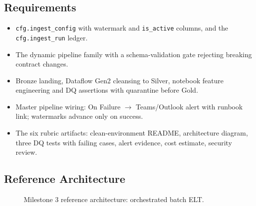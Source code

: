 \subsection*{Requirements}
\begin{itemize}
    \item \texttt{cfg.ingest\_config} with watermark and \texttt{is\_active} columns, and the \texttt{cfg.ingest\_run} ledger.
    \item The dynamic pipeline family with a schema-validation gate rejecting breaking contract changes.
    \item Bronze landing, Dataflow Gen2 cleansing to Silver, notebook feature engineering and DQ assertions with quarantine before Gold.
    \item Master pipeline wiring: On Failure $\rightarrow$ Teams/Outlook alert with runbook link; watermarks advance only on success.
    \item The six rubric artifacts: clean-environment README, architecture diagram, three DQ tests with failing cases, alert evidence, cost estimate, security review.
\end{itemize}

\subsection*{Reference Architecture}
\begin{figure}[H]
    \centering
    \caption{Milestone 3 reference architecture: orchestrated batch ELT.}
    \label{fig:chapter12-capstone-architecture}
\end{figure}

